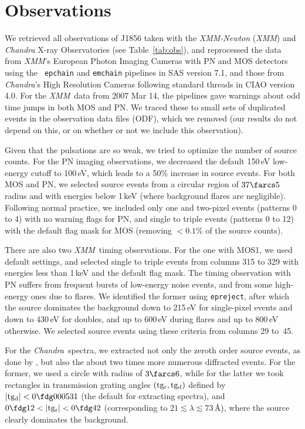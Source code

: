 \documentclass{emulateapj}\usepackage{apjfonts}
\newcommand{\cxo}{{\em Chandra}}
\newcommand{\xmm}{{\em XMM}}
\begin{document}
\section{Observations}
\label{sec:obs}
We retrieved all observations of J1856 taken with the {\em XMM-Newton}
(\xmm) and {\em Chandra} X-ray Observatories (see
Table~\ref{tab:obs}), and reprocessed the data from \xmm\/'s European
Photon Imaging Cameras with PN and MOS detectors using the {\tt
  epchain} and {\tt emchain} pipelines in SAS version 7.1, and those
from \cxo's High Resolution Cameras following standard threads in CIAO
version 4.0.  For the \xmm\ data from 2007 Mar 14, the pipelines gave
warnings about odd time jumps in both MOS and PN.  We traced these to
small sets of duplicated events in the observation data files (ODF),
which we removed (our results do not depend on this, or on whether or
not we include this observation).

Given that the pulsations are so weak, we tried to optimize the number
of source counts.  For the PN imaging observations, we decreased the
default 150\,eV low-energy cutoff to 100\,eV, which leads to a 50\%
increase in source events.  For both MOS and PN, we selected source
events from a circular region of $37\farcs5$ radius and with energies
below 1\,keV (where background flares are negligible).  Following
normal practice, we included only one and two-pixel events (patterns 0
to 4) with no warning flags for PN, and single to triple events
(patterns 0 to 12) with the default flag mask for MOS (removing
$<\!0.1$\% of the source counts).

There are also two \xmm\ timing observations.  For the one with MOS1,
we used default settings, and selected single to triple events from
columns 315 to 329
with energies less than 1\,keV and the default flag mask.  The timing
observation with PN suffers from frequent bursts of low-energy noise
events, and from some high-energy ones due to flares.  We identified
the former using {\tt epreject}, after which the source dominates the
background down to 215\,eV for single-pixel events and down to 430\,eV
for doubles, and up to 600\,eV during flares and up to 800\,eV
otherwise.  We selected source events using these criteria from
columns 29 to~45.

For the \cxo\ spectra, we extracted not only the zeroth order source
events, as done by , but also the about two times
more numerous diffracted events.  For the former, we used a circle
with radius of $3\farcs6$, while for the latter we took rectangles in
transmission grating angles $({\rm tg_r},{\rm tg_d})$ defined by
$|{\rm tg_d}|<0\fdg000531$ (the default for extracting spectra), and
$0\fdg12<|{\rm tg_r}|<0\fdg42$ (corresponding to
$21\lesssim\lambda\lesssim73$\,\AA), where the source clearly
dominates the background.
\end{document}
